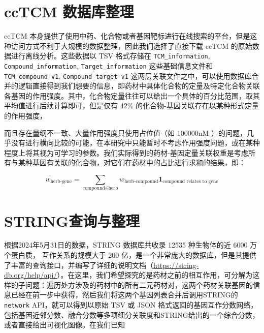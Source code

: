 \section{ccTCM 数据库整理}

ccTCM 本身提供了使用中药、化合物或者基因靶标进行在线搜索的平台，但是这种访问方式不利于大规模的数据整理，因此我们选择了直接下载 ccTCM 的原始数据进行离线分析。这些数据以 TSV 格式存储在 \texttt{TCM\_information}, \texttt{Compound\_information}, \texttt{Target\_information} 这些基础信息文件和 \texttt{TCM\_compound-v1}, \texttt{Compound\_target-v1} 这两层关联文件之中，可以使用数据库合并的逻辑直接得到我们想要的信息，即药材中具体化合物的定量及特定化合物关联各基因的作用强度。其中，化合物定量往往可以给出一个具体的百分比范围，取其平均值进行后续计算即可，但是仅有 42\% 的化合物-基因关联存在以某种形式定量的作用强度，

而且存在量纲不一致、大量作用强度只使用占位值（如 $100000 \mathrm{nM}$ ）的问题，几乎没有进行横向比较的可能，在本研究中只能暂时不考虑作用强度问题，或在某种程度上将其视为可学习的参数。我们实际得到的药材-基因定量关联权重是考虑所有与某种基因有关联的化合物，对它们在药材中的占比进行求和的结果，即：


$$
w_{\text{herb-gene}} = \sum_{\text{compound} \in \text{herb}} w_{\text{herb-compound}} \mathbf{1}_{\text{compound relates to gene}}
$$

\section{STRING查询与整理}

根据2024年5月31日的数据，STRING 数据库共收录 12535 种生物体的近 6000 万个蛋白质， 互作关系的规模大于 200 亿，是一个非常庞大的数据库，但是其提供了丰富的查询接口，并编写了详细的说明文档（\url{https://string-db.org/help/api/}）。在这里，我们希望探究的是药材之前的相互作用，可分解为这样的子问题：遍历处方涉及的药材中的所有二元药材对，这两个药材关联基因的信息已经在前一步中获得，然后我们将这两个基因列表合并后调用STRING的 \texttt{network} API，就可以得到以原始 TSV 或 JSON 格式返回的基因互作分数网络，包括基因近邻分数、融合分数等多项细分关联度和STRING给出的一个综合分数，或者直接给出可视化图像。在我们已知